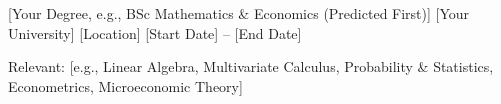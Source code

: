 

\begin{cventries}

  \cventry
    {[Your Degree, e.g., BSc Mathematics & Economics (Predicted First)]} %
    {[Your University]} %
    {[Location]} %
    {[Start Date] -- [End Date]} %
    {
      \begin{cvitems}
        \item {Relevant: [e.g., Linear Algebra, Multivariate Calculus, Probability \& Statistics, Econometrics, Microeconomic Theory]}
      \end{cvitems}
    }

\end{cventries}
